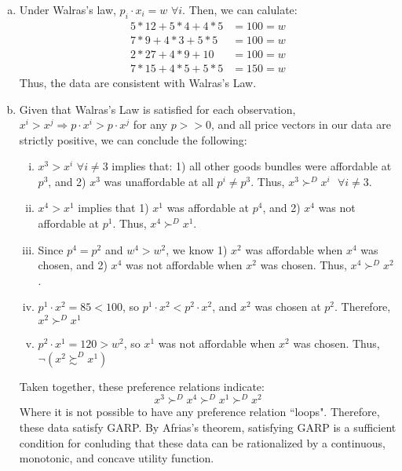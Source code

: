 \documentclass{article}
\begin{document}
\begin{enumerate}[(a)]
	\item Under Walras's law, $p_i\cdot x_i = w$ $\forall i$. Then, we can calulate:
		\begin{align*}
			5*12+5*4+4*5	&= 100 = w	\\
			7*9+4*3+5*5		&= 100 = w	\\
			2*27+4*9+10		&= 100 = w	\\
			7*15+4*5+5*5	&= 150 = w
		\end{align*}
		Thus, the data are consistent with Walras's Law.
		
	\item Given that Walras's Law is satisfied for each observation, $x^i>x^j\Rightarrow p\cdot x^i>p\cdot x^j$ for any $p>>0$, and all price vectors in our data are strictly positive, we can conclude the following:
		\begin{enumerate}[i.]
			\item $x^3>x^i$ $\forall i\neq 3$ implies that: 1) all other goods bundles were affordable at $p^3$, and 2) $x^3$ was unaffordable at all $p^i\neq p^3$. Thus, ${x^3\succ^D x^i\text{ }\forall i\neq 3}$.
			\item $x^4>x^1$ implies that 1) $x^1$ was affordable at $p^4$, and 2) $x^4$ was not affordable at $p^1$. Thus, ${x^4\succ^D x^1}$.
			\item Since $p^4=p^2$ and $w^4>w^2$, we know 1) $x^2$ was affordable when $x^4$ was chosen, and 2) $x^4$ was not affordable when $x^2$ was chosen. Thus, ${x^4\succ^D x^2}$.
			\item $p^1\cdot x^2 = 85<100$, so $p^1\cdot x^2 < p^2\cdot x^2$, and $x^2$ was chosen at $p^2$. Therefore, ${x^2\succ^D x^1}$
			\item $p^2\cdot x^1=120>w^2$, so $x^1$ was not affordable when $x^2$ was chosen. Thus, $\neg(x^2\succsim^D x^1)$
		\end{enumerate}
		Taken together, these preference relations indicate:
		\[
			x^3\succ^D x^4 \succ^D x^1 \succ^D x^2
		\]
		Where it is not possible to have any preference relation ``loops". Therefore, these data satisfy GARP. By Afrias's theorem, satisfying GARP is a sufficient condition for conluding that these data can be rationalized by a continuous, monotonic, and concave utility function.
\end{enumerate}

\end{document}
